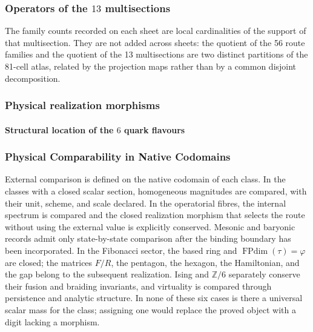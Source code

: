 
\subsubsection{Operators of the \(13\) multisections}

The family counts recorded on each sheet are local cardinalities of the
support of that multisection. They are not added across sheets: the quotient of the
56 route families and the quotient of the 13 multisections are two distinct
partitions of the 81-cell atlas, related by the projection maps rather than
by a common disjoint decomposition.



\subsubsection{Physical realization morphisms}




\paragraph{Structural location of the \(6\) quark flavours}




\subsubsection{Physical Comparability in Native Codomains}

External comparison is defined on the native codomain of each class. In the
classes with a closed scalar section, homogeneous magnitudes are compared, with their unit,
scheme, and scale declared. In the operatorial fibres, the internal spectrum
is compared and the closed realization morphism that selects
the route without using the external value is explicitly conserved. Mesonic and baryonic records admit only state-by-state comparison after the binding boundary has been incorporated. In the Fibonacci sector,
the based ring and \(\operatorname{FPdim}(\tau)=\varphi\) are closed; the matrices
\(F/R\), the pentagon, the hexagon, the Hamiltonian, and the gap belong to the
subsequent realization. Ising and \(\mathbb Z/6\) separately conserve their fusion
and braiding invariants, and virtuality is compared through persistence and analytic
structure. In none of these six
cases is there a universal scalar mass for the class; assigning one would replace the proved
object with a digit lacking a morphism.
